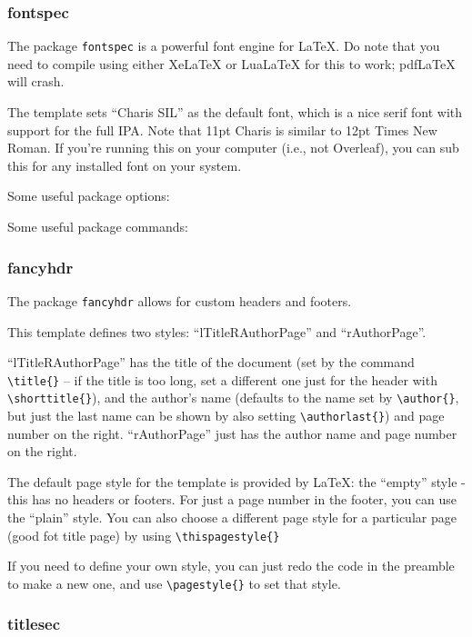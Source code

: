 \documentclass[12pt]{article}
\begin{document}
\subsubsection{fontspec}

    The package \texttt{fontspec} is a powerful font engine for \LaTeX. Do note that you need to compile using either XeLaTeX or LuaLaTeX for this to work; pdfLaTeX will crash. 

    The template sets ``Charis SIL'' as the default font, which is a nice serif font with support for the full IPA. Note that 11pt Charis is similar to 12pt Times New Roman. If you're running this on your computer (i.e., not Overleaf), you can sub this for any installed font on your system. 

    Some useful package options:

    Some useful package commands:

\subsubsection{fancyhdr}

    The package \texttt{fancyhdr} allows for custom headers and footers. 

    This template defines two styles: ``lTitleRAuthorPage'' and ``rAuthorPage''. 
    
    ``lTitleRAuthorPage'' has the title of the document (set by the command \texttt{\textbackslash title\{\}} -- if the title is too long, set a different one just for the header with \texttt{\textbackslash shorttitle\{\}}), and the author's name (defaults to the name set by \texttt{\textbackslash author\{\}}, but just the last name can be shown by also setting \texttt{\textbackslash authorlast\{\}}) and page number on the right. ``rAuthorPage'' just has the author name and page number on the right. 

    The default page style for the template is provided by \LaTeX: the ``empty'' style - this has no headers or footers. For just a page number in the footer, you can use the ``plain'' style. You can also choose a different page style for a particular page (good fot title page) by using \texttt{\textbackslash thispagestyle\{\}}

    If you need to define your own style, you can just redo the code in the preamble to make a new one, and use \texttt{\textbackslash pagestyle\{\}} to set that style. 

\subsubsection{titlesec}
\end{document}
